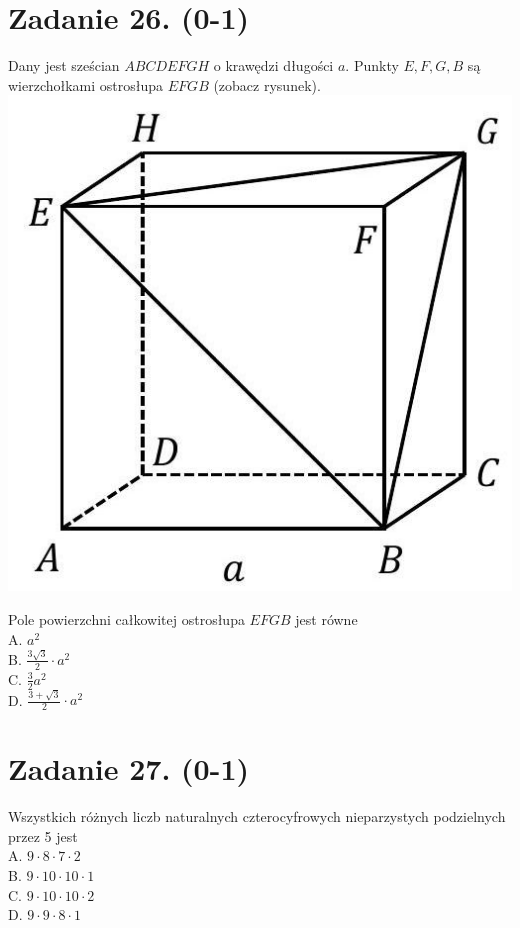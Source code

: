 \documentclass[10pt]{article}
\begin{document}
\section*{Zadanie 26. (0-1)}
Dany jest sześcian \(A B C D E F G H\) o krawędzi długości \(a\). Punkty \(E, F, G, B\) są wierzchołkami ostrosłupa \(E F G B\) (zobacz rysunek).\\
\includegraphics[max width=\textwidth, center]{2024_11_21_465acd0c12fa3e05e8a7g-14}

Pole powierzchni całkowitej ostrosłupa \(E F G B\) jest równe\\
A. \(a^{2}\)\\
B. \(\frac{3 \sqrt{3}}{2} \cdot a^{2}\)\\
C. \(\frac{3}{2} a^{2}\)\\
D. \(\frac{3+\sqrt{3}}{2} \cdot a^{2}\)

\section*{Zadanie 27. (0-1)}
Wszystkich różnych liczb naturalnych czterocyfrowych nieparzystych podzielnych przez 5 jest\\
A. \(9 \cdot 8 \cdot 7 \cdot 2\)\\
B. \(9 \cdot 10 \cdot 10 \cdot 1\)\\
C. \(9 \cdot 10 \cdot 10 \cdot 2\)\\
D. \(9 \cdot 9 \cdot 8 \cdot 1\)
\end{document}

